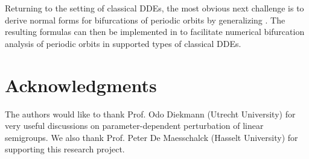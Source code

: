 Returning to the setting of classical DDEs, the most obvious next challenge is to derive normal forms for bifurcations of periodic orbits by generalizing \cite{Kuznetsov2005,DeWitte2013,DeWitte2014}. The resulting formulas can then be implemented in \DDEBIFTOOL to facilitate numerical bifurcation analysis of periodic orbits in supported types of classical DDEs.

\section*{Acknowledgments}
The authors would like to thank Prof. Odo Diekmann (Utrecht University) for very useful discussions on parameter-dependent perturbation of linear semigroups. We also thank Prof. Peter De Maesschalck (Hasselt University) for supporting this research project.

